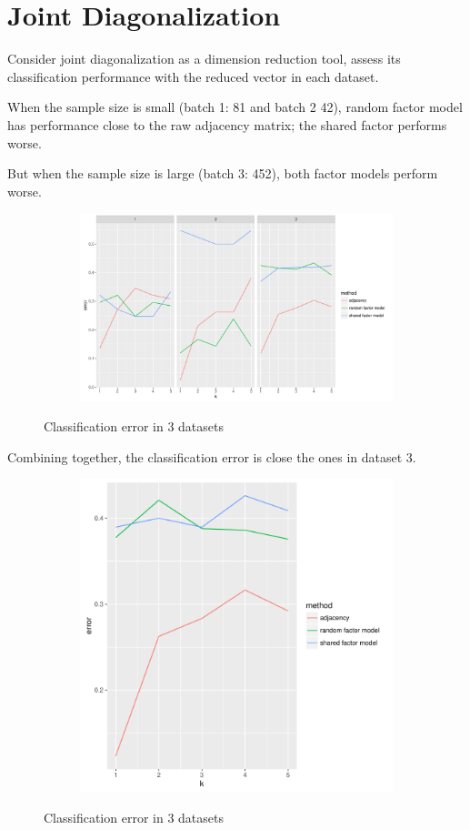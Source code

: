 \documentclass[12pt]{article}
\newcommand{\bfi}{\begin{figure}[H]}
\newcommand{\efi}{\end{figure}}
\newcommand{\bsfi}{\begin{subfigure}[t]}
\newcommand{\esfi}{\end{subfigure}}
\begin{document}
\section{Joint Diagonalization}

Consider joint diagonalization as a dimension reduction tool, assess its classification performance with the reduced vector in each dataset.

When the sample size is small (batch 1: 81 and batch 2 42), random factor model has performance close to the raw adjacency matrix; the shared factor performs worse. 

But when the sample size is large (batch 3: 452), both factor models perform worse.

\bfi
\centering
\bsfi{1\columnwidth}
\includegraphics[width=1\columnwidth]{../BatchEffectRemoval/knnErrorPerDataset}
\esfi
\caption{Classification error in 3 datasets}
\efi

Combining together, the classification error is close the ones in dataset 3.


\bfi
\centering
\bsfi{1\columnwidth}
\includegraphics[width=.5\columnwidth]{../BatchEffectRemoval/knnErrorCombined}
\esfi
\caption{Classification error in 3 datasets}
\efi
\end{document}

